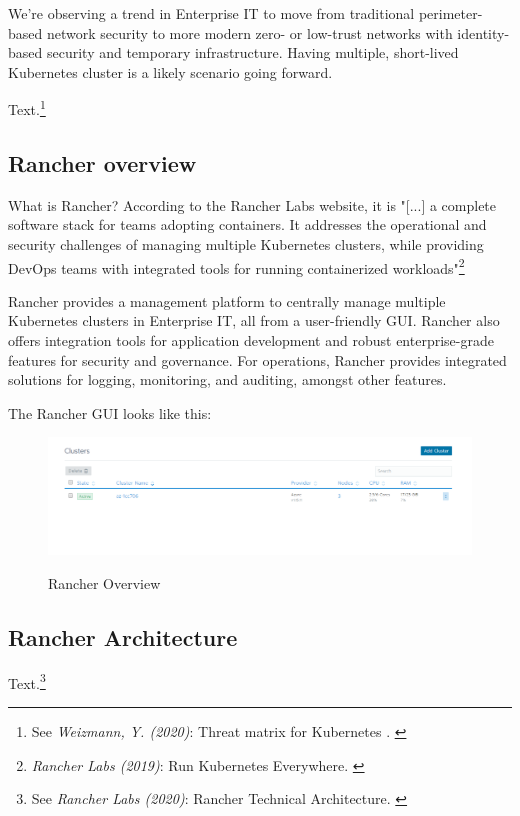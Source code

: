 We're observing a trend in Enterprise IT to move from traditional perimeter-based network security to more modern zero- or low-trust networks with identity-based security and temporary infrastructure. Having multiple, short-lived Kubernetes cluster is a likely scenario going forward.

Text.\footnote{See \textit{Weizmann, Y. (2020)}: Threat matrix for Kubernetes . \cite{threatMatrix}}

\subsection{Rancher overview}

What is Rancher? According to the Rancher Labs website, it is "[...] a complete software stack for teams adopting containers. It addresses the operational and security challenges of managing multiple Kubernetes clusters, while providing DevOps teams with integrated tools for running containerized workloads"\footnote{\textit{Rancher Labs (2019)}: Run Kubernetes Everywhere. \cite{rancher}}

Rancher provides a management platform to centrally manage multiple Kubernetes clusters in Enterprise IT, all from a user-friendly GUI. Rancher also offers integration tools for application development and robust enterprise-grade features for security and governance. For operations, Rancher provides integrated solutions for logging, monitoring, and auditing, amongst other features.

The Rancher GUI looks like this:

\begin{figure}[H]
\centering
\caption {Rancher Overview}
\includegraphics[width=\linewidth]{images/cluster-overview.png}
\label{fig:rancherOverview}
\end{figure}


\subsection{Rancher Architecture}

Text.\footnote{See \textit{Rancher Labs (2020)}: Rancher Technical Architecture. \cite{technicalArchitecture}}

